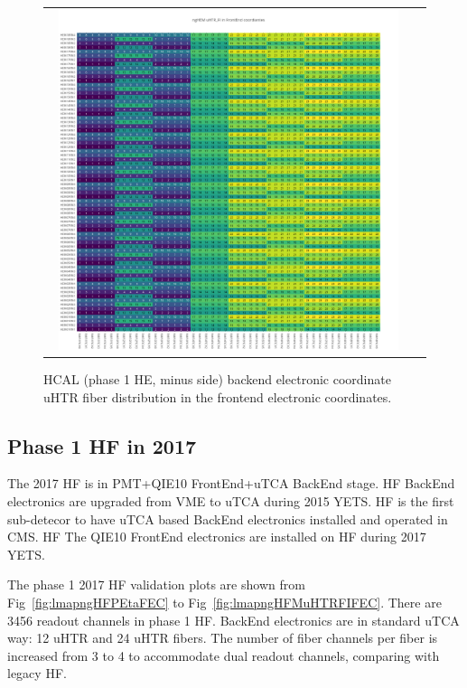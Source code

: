 \begin{figure}[htb]
 \begin{center}
  \begin{tabular}{cc}
   \includegraphics[angle=0,width=0.95\textwidth]{figures/appendix/ngHEM_uHTR_FI_in_FrontEnd.png}
  \end{tabular}
  \caption{HCAL (phase 1 HE, minus side) backend electronic coordinate uHTR fiber distribution in the frontend electronic coordinates.}
  \label{fig:lmapngHEMuHTRFIFEC}
 \end{center}
\end{figure}
\clearpage

\subsection{Phase 1 HF in 2017}
The 2017 HF is in PMT+QIE10 FrontEnd+uTCA BackEnd stage. HF BackEnd electronics are upgraded from VME to uTCA during 2015 YETS. HF is the first sub-detecor to have uTCA based BackEnd electronics installed and operated in CMS. HF The QIE10 FrontEnd electronics are installed on HF during 2017 YETS. 

The phase 1 2017 HF validation plots are shown from Fig~\ref{fig:lmapngHFPEtaFEC} to Fig~\ref{fig:lmapngHFMuHTRFIFEC}. There are 3456 readout channels in phase 1 HF. BackEnd electronics are in standard uTCA way: 12 uHTR and 24 uHTR fibers. The number of fiber channels per fiber is increased from 3 to 4 to accommodate dual readout channels, comparing with legacy HF. 
\clearpage

